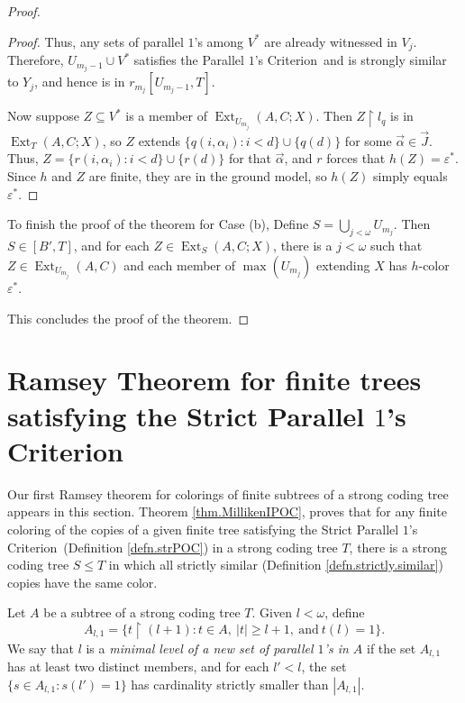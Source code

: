 \documentclass{amsart}
\theoremstyle{remark}
\theoremstyle{definition}
\theoremstyle{remark}
\newcommand{\al}{\alpha}
\newcommand{\om}{\omega}
\newcommand{\sse}{\subseteq}
\DeclareMathOperator{\Ext}{Ext}
\newcommand{\re}{\restriction}
\newcommand{\POC}{Parallel $1$'s Criterion}
\newcommand{\SPOC}{Strict Parallel $1$'s Criterion}
\begin{document}
\begin{proof}
\begin{proof}
Thus,
any sets of parallel $1$'s among $V^*$
are already witnessed in $V_j$.
Therefore,  $U_{m_j-1}\cup V^*$
satisfies the \POC\ and is strongly similar to $Y_j$,
and hence is in $r_{m_j}[U_{m_j-1},T]$.



Now suppose  $Z\sse V^*$ is a member of
$\Ext_{U_{m_j}}(A,C;X)$.
Then $Z\re l_q$ is in $\Ext_{T}(A,C;X)$,
so $Z$
extends $\{q(i,\al_i):i<d\}\cup \{q(d)\}$ for some $\vec\al\in \vec{J}$.
Thus, $Z=\{r(i,\al_i):i<d\}\cup \{r(d)\}$ for  that  $\vec\al$,
and  $r$ forces that $h(Z)=\varepsilon^*$.
Since $h$ and $Z$ are finite, they are  in the ground model, so
$h(Z)$ simply equals $\varepsilon^*$.
\end{proof}



To finish the proof of the theorem for Case (b),
Define  $S=\bigcup_{j<\om}U_{m_j}$.
Then $S\in [B',T]$, and
for each $Z\in\Ext_{S}(A,C;X)$, there is a $j<\om$ such that $Z\in\Ext_{U_{m_j}}(A,C)$ and
each member of
 $\max(U_{m_j})$ extending $X$  has $h$-color
 $\varepsilon^*$.

This concludes the proof of the theorem.
\end{proof}














\section{Ramsey Theorem for  finite  trees satisfying the \SPOC}\label{sec.1SPOC}



Our first   Ramsey theorem for  colorings of   finite subtrees  of a strong coding tree appears in this section.
Theorem \ref{thm.MillikenIPOC}, proves
that for any finite coloring of  the copies of a given finite tree satisfying the  \SPOC\  (Definition \ref{defn.strPOC})  in a strong coding tree $T$,
there is a strong coding tree $S\le T$ in which all strictly similar (Definition \ref{defn.strictly.similar}) copies have the same color.


Let $A$ be a   subtree of  a strong coding tree $T$.
Given  $l<\om$, define
\begin{equation}
A_{l,1}=\{t\re (l+1):t\in A,\ |t|\ge l+1,\mathrm{\  and\ }t(l)=1\}.
\end{equation}
We say that $l$ is a {\em minimal level of a new set of  parallel $1$'s in $A$} if
the set $A_{l,1}$ has at least two distinct members,
and for each $l'<l$,
the set $\{s\in A_{l,1}:  s(l')=1\}$ has cardinality strictly smaller than $|A_{l,1}|$.
\end{document}
